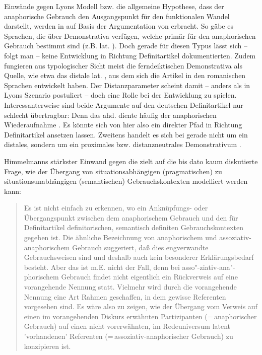 Einwände gegen Lyons Modell bzw. die allgemeine Hypothese, dass der anaphorische Gebrauch den Ausgangspunkt für den funktionalen Wandel darstellt, werden in 
\textcite[527]{deMulder2011} auf Basis der Argumentation von \textcite[96--98]{Himmelmann1997} erbracht. So gäbe es Sprachen, die über Demonstrativa verfügen, welche primär für den anaphorischen Gebrauch bestimmt sind (z.B. lat. ). Doch gerade für diesen Typus lässt sich -- folgt man \textcite[98]{Himmelmann1997} -- keine Entwicklung in Richtung Definitartikel dokumentierten.  Zudem fungieren aus typologischer Sicht meist die ferndeiktischen Demonstrativa als Quelle, wie etwa das distale lat. , aus dem sich die Artikel in den romanischen Sprachen entwickelt haben. Der Distanzparameter scheint damit -- anders als in Lyons Szenario postuliert -- doch eine Rolle bei der Entwicklung zu spielen. Interessanterweise sind beide Argumente auf den deutschen Definitartikel nur schlecht übertragbar: Denn das ahd.  diente häufig der anaphorischen Wiederaufnahme  \parencite[z.B.][]{Jager1917, Jager1918,Oubouzar1992,Leiss2000}. Es könnte sich von hier also ein direkter Pfad in Richtung Definitartikel ansetzen lassen. Zweitens handelt es sich bei  gerade nicht um ein distales, sondern um ein proximales bzw. distanzneutrales Demonstrativum . 


Himmelmanns stärkster Einwand gegen die  zielt auf die bis dato kaum diskutierte Frage, wie der Übergang von situationsabhängigen (pragmatischen) zu situationsunabhängigen (semantischen) Gebrauchskontexten modelliert werden kann: \blockcquote[94]{Himmelmann1997}{Es ist nicht einfach zu erkennen, wo ein Anknüpfungs- oder Übergangspunkt zwischen dem anaphorischem Gebrauch und den für Definitartikel definitorischen, semantisch definiten Gebrauchskontexten gegeben ist. Die ähnliche Bezeichnung von anaphorischem und assoziativ-anaphorischem Gebrauch suggeriert, daß dies engverwandte Gebrauchsweisen sind und deshalb auch kein besonderer Erklärungsbedarf besteht. Aber das ist m.E. nicht der Fall, denn bei asso"-ziativ-ana"-phorischem Gebrauch findet nicht eigentlich ein Rückverweis auf eine
vorangehende Nennung statt. Vielmehr wird durch die vorangehende Nennung eine Art Rahmen geschaffen, in dem gewisse Referenten vorgesehen sind. 
Es wäre also zu zeigen, wie der Übergang vom Verweis auf einen
im vorangehenden Diskurs erwähnten Partizipanten (=\,anaphorischer Gebrauch) auf einen
nicht vorerwähnten, im Redeuniversum latent 'vorhandenen' Referenten (=\,assoziativ-anaphorischer Gebrauch) zu konzipieren ist.}


